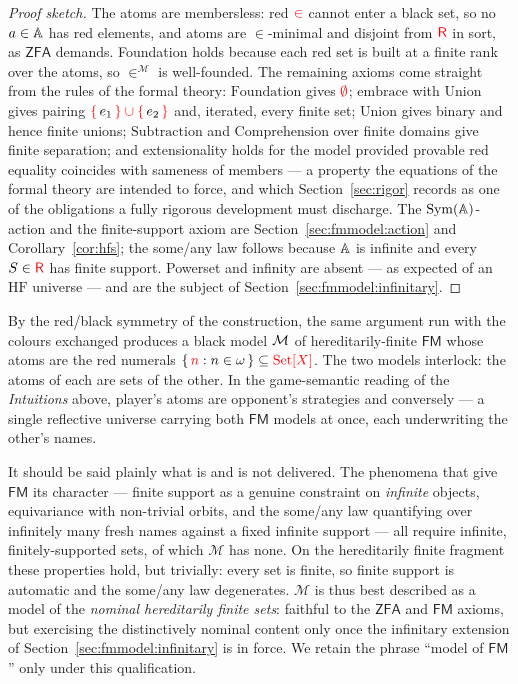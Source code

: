 \begin{proof}[Proof sketch]
The atoms are membersless: red $\mathrel{\textcolor{red}{\in}}$ cannot enter a black set, so no
$a\in\mathbb{A}$ has red elements, and atoms are $\in$-minimal and disjoint from
$\textcolor{red}{\mathsf{R}}$ in sort, as $\mathsf{ZFA}$ demands. Foundation holds because each red set
is built at a finite rank over the atoms, so $\in^{\mathcal M}$ is well-founded.
The remaining axioms come straight from the rules of the formal theory:
$\mathrm{Foundation}$ gives $\textcolor{red}{\emptyset}$; $\mathrm{embrace}$ with $\mathrm{Union}$
gives pairing $\textcolor{red}{\{}\,e_1\,\textcolor{red}{\}}\mathbin{\textcolor{red}{\cup}}\textcolor{red}{\{}\,e_2\,\textcolor{red}{\}}$ and, iterated, every finite set;
$\mathrm{Union}$ gives binary and hence finite unions; $\mathrm{Subtraction}$ and
$\mathrm{Comprehension}$ over finite domains give finite separation; and
extensionality holds for the model provided provable red equality coincides with
sameness of members --- a property the equations of the formal theory are intended
to force, and which Section~\ref{sec:rigor} records as one of the obligations a
fully rigorous development must discharge. The $\mathrm{Sym}(\mathbb{A})$-action and the
finite-support axiom are Section~\ref{sec:fmmodel:action} and
Corollary~\ref{cor:hfs}; the some/any law follows because $\mathbb{A}$ is infinite
and every $S\in\textcolor{red}{\mathsf{R}}$ has finite support. Powerset and infinity are absent --- as
expected of an $\mathrm{HF}$ universe --- and are the subject of
Section~\ref{sec:fmmodel:infinitary}.
\end{proof}

\begin{corollary}
\label{cor:two}
By the red/black symmetry of the construction, the same argument run with the
colours exchanged produces a black model $\textcolor{black}{\mathcal M}$ of
hereditarily-finite $\mathsf{FM}$ whose atoms are the red numerals
$\{\,\textcolor{red}{n} : n\in\omega\,\}\subseteq\textcolor{red}{\mathrm{Set}[X]}$. The two models interlock: the atoms
of each are sets of the other. In the game-semantic reading of the
\emph{Intuitions} above, player's atoms are opponent's strategies and conversely
--- a single reflective universe carrying both $\mathsf{FM}$ models at once, each
underwriting the other's names.
\end{corollary}

\begin{remark}
\label{rem:hftrivial}
It should be said plainly what is and is not delivered. The phenomena that give
$\mathsf{FM}$ its character --- finite support as a genuine constraint on
\emph{infinite} objects, equivariance with non-trivial orbits, and the some/any
law quantifying over infinitely many fresh names against a fixed infinite
support --- all require infinite, finitely-supported sets, of which $\mathcal{M}$
has none. On the hereditarily finite fragment these properties hold, but
trivially: every set is finite, so finite support is automatic and the some/any
law degenerates. $\mathcal{M}$ is thus best described as a model of the
\emph{nominal hereditarily finite sets}: faithful to the $\mathsf{ZFA}$ and
$\mathsf{FM}$ axioms, but exercising the distinctively nominal content only once
the infinitary extension of Section~\ref{sec:fmmodel:infinitary} is in force. We
retain the phrase ``model of $\mathsf{FM}$'' only under this qualification.
\end{remark}


